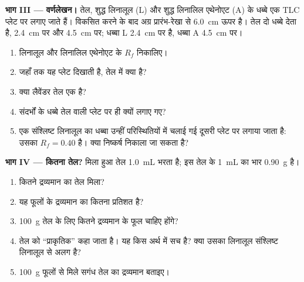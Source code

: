\begin{problem}[{सप्ताहांत समस्या --- लैवेंडर के फूलों की एक टोकरी से सगंध तेल की
कुछ बूँदों तक, वर्णलेखन से जाँची गई}]
\medskip
\noindent\textbf{भाग III --- वर्णलेखन।}
तेल, शुद्ध लिनालूल (L) और शुद्ध लिनालिल एथेनोएट (A) के धब्बे
एक TLC प्लेट पर लगाए जाते हैं। विकसित करने के बाद अग्र प्रारंभ-रेखा से
\qty{6.0}{cm} ऊपर है। तेल दो धब्बे देता है, \qty{2.4}{cm} पर और
\qty{4.5}{cm} पर; धब्बा L \qty{2.4}{cm} पर है, धब्बा A \qty{4.5}{cm} पर।
\begin{enumerate}[resume]
  \item लिनालूल और लिनालिल एथेनोएट के $R_f$ निकालिए।
  \item जहाँ तक यह प्लेट दिखाती है, तेल में क्या है?
  \item क्या लैवेंडर तेल एक  है?
  \item संदर्भों के धब्बे तेल वाली प्लेट पर ही क्यों लगाए गए?
  \item एक संश्लिष्ट लिनालूल का धब्बा उन्हीं परिस्थितियों में चलाई गई दूसरी प्लेट
        पर लगाया जाता है: उसका $R_f = 0.40$ है। क्या निष्कर्ष निकाला जा सकता है?
\end{enumerate}

\medskip
\noindent\textbf{भाग IV --- कितना तेल?}
मिला हुआ तेल \qty{1.0}{mL} भरता है; इस तेल के \qty{1}{mL} का भार
\qty{0.90}{g} है।
\begin{enumerate}[resume]
  \item कितने द्रव्यमान का तेल मिला?
  \item यह फूलों के द्रव्यमान का कितना प्रतिशत है?
  \item \qty{100}{g} तेल के लिए कितने द्रव्यमान के फूल चाहिए होंगे?
  \item तेल को ``प्राकृतिक'' कहा जाता है। यह किस अर्थ में सच है? क्या
        उसका लिनालूल संश्लिष्ट लिनालूल से अलग है?
  \item \qty{100}{g} फूलों से मिले सगंध तेल का द्रव्यमान
        बताइए।
\end{enumerate}
\end{problem}
